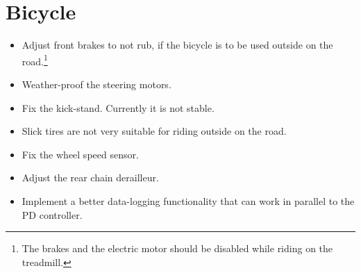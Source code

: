 \section{Bicycle}
\begin{itemize}[noitemsep]
  \item Adjust front brakes to not rub, if the bicycle is to be used outside on the road.\footnote{The brakes and the electric motor should be disabled while riding on the treadmill.}
  \item Weather-proof the steering motors.
  \item Fix the kick-stand. Currently it is not stable.
  \item Slick tires are not very suitable for riding outside on the road.
  \item Fix the wheel speed sensor.
  \item Adjust the rear chain derailleur.
  \item Implement a better data-logging functionality that can work in parallel to the PD controller.
\end{itemize}
